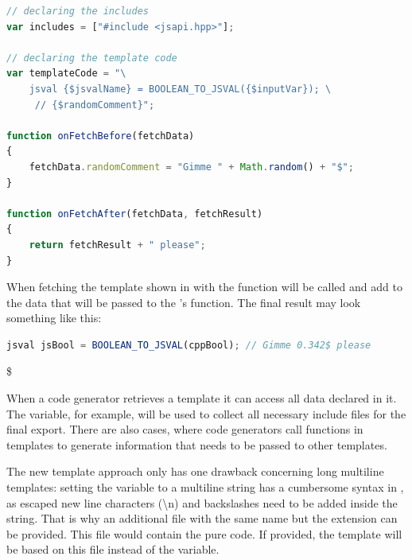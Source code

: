 \SingleSpacing
\begin{lstlisting}[language=JavaScript, caption=Example of a template file, label=lst:TemplateFile]
// declaring the includes
var includes = ["#include <jsapi.hpp>"];

// declaring the template code
var templateCode = "\
	jsval {$jsvalName} = BOOLEAN_TO_JSVAL({$inputVar}); \
	 // {$randomComment}";

function onFetchBefore(fetchData)
{
	fetchData.randomComment = "Gimme " + Math.random() + "$";
}

function onFetchAfter(fetchData, fetchResult)
{
	return fetchResult + " please";
}
\end{lstlisting}
\OnehalfSpacing

When fetching the template shown in  with  the  function will be called and add \linebreak{} to the data that will be passed to the 's  function. The final result may look something like this:

\SingleSpacing
\begin{lstlisting}[language=JavaScript, caption=Result of fetching a template]
jsval jsBool = BOOLEAN_TO_JSVAL(cppBool); // Gimme 0.342$ please
\end{lstlisting}
\OnehalfSpacing
\$

When a code generator retrieves a template it can access all data declared in it. The  variable, for example, will be used to collect all necessary include files for the final export. There are also cases, where code generators call functions in templates to generate information that needs to be passed to other templates.

The new template approach only has one drawback concerning long multiline \myProperName{jSmart} templates: setting the \mySCName{templateCode} variable to a multiline string has a cumbersome syntax in \myProperName{JavaScript}, as escaped new line characters (\textbackslash n) and backslashes need to be added inside the string. That is why an additional file with the same name but the  extension can be provided. This file would contain the pure  code. If provided, the  template will be based on this file instead of the  variable.

